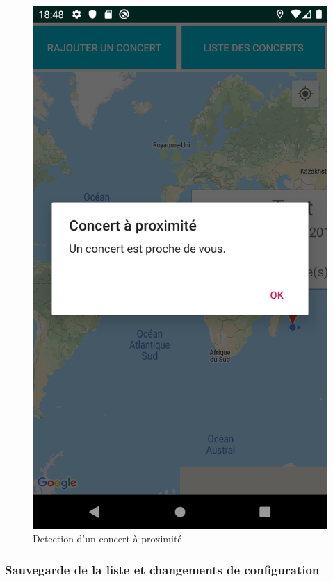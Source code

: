 \documentclass{article}
\begin{document}
\begin{figure}[h!]
\centering
\includegraphics[scale=0.13]{./img/proche.png}
\caption{Detection d'un concert à proximité \label{fig:proche}}
\end{figure}

\subsubsection{Sauvegarde de la liste et changements de configuration}
\end{document}
